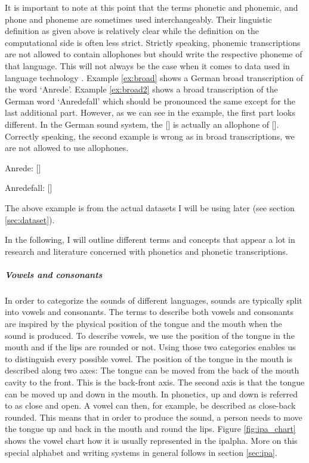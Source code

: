 It is important to note at this point that the terms phonetic and phonemic, and phone and phoneme are sometimes used interchangeably. Their linguistic definition as given above is relatively clear while the definition on the computational side is often less strict. Strictly speaking, phonemic transcriptions are not allowed to contain allophones but should write the respective phoneme of that language. This will not always be the case when it comes to data used in language technology \citep{Lee&Ashby.2020}. Example \ref{ex:broad} shows a German broad transcription of the word `Anrede'. Example \ref{ex:broad2} shows a broad transcription of the German word `Anredefall' which should be pronounced the same except for the last additional part. However, as we can see in the example, the first part looks different. In the German sound system, the [] is actually an allophone of []. Correctly speaking, the second example is wrong as in broad transcriptions, we are not allowed to use allophones. 

\begin{covexamples}
\item \label{ex:broad} Anrede: [] %
\item \label{ex:broad2} Anredefall: [] %
\end{covexamples}

The above example is from the actual datasets I will be using later (see section \ref{sec:dataset}). 

In the following, I will outline different terms and concepts that appear a lot in research and literature concerned with phonetics and phonetic transcriptions.

\subparagraph{Vowels and consonants} In order to categorize the sounds of different languages, sounds are typically split into vowels and consonants. The terms to describe both vowels and consonants are inspired by the physical position of the tongue and the mouth when the sound is produced. To describe vowels, we use the position of the tongue in the mouth and if the lips are rounded or not. Using those two categories enables us to distinguish every possible vowel. The position of the tongue in the mouth is described along two axes: The tongue can be moved from the back of the mouth cavity to the front. This is the back-front axis. The second axis is that the tongue can be moved up and down in the mouth. In phonetics, up and down is referred to as close and open. A vowel can then, for example, be described as close-back rounded. This means that in order to produce the sound, a person needs to move the tongue up and back in the mouth and round the lips. Figure \ref{fig:ipa_chart} shows the vowel chart how it is usually represented in the \ac{ipalpha}. More on this special alphabet and writing systems in general follows in section \ref{sec:ipa}. 

